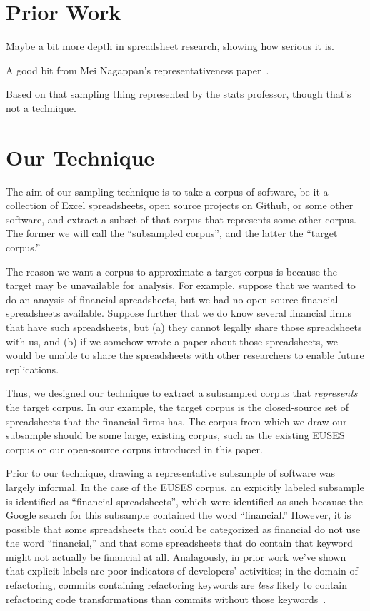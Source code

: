 \documentclass[conference]{IEEEtran}
\begin{document}
\section{Prior Work}

Maybe a bit more depth in spreadsheet research, showing how serious it is.

A good bit from Mei Nagappan's representativeness paper~\cite{nagappan2013diversity}.

Based on that sampling thing represented by the stats professor,
though that's not a technique.

\section{Our Technique}

The aim of our sampling technique is to take a corpus of software, be it 
a collection of Excel spreadsheets, open source projects on Github, 
or some other software, and extract a subset of that corpus that represents
some other corpus.
The former we will call the ``subsampled corpus'', and the latter the
``target corpus.''

The reason we want a corpus to approximate a target corpus is because the 
target may be unavailable for analysis.
For example, suppose that we wanted to do an anaysis of financial spreadsheets,
but we had no open-source financial spreadsheets available.
Suppose further that we do know several financial firms that have such spreadsheets,
but (a) they cannot legally share those spreadsheets with us, and (b) if we somehow wrote a paper
about those spreadsheets, we would be unable to share the spreadsheets with other researchers
to enable future replications.

Thus, we designed our technique to extract a subsampled corpus that \emph{represents}
the target corpus.
In our example, the target corpus is the closed-source set of spreadsheets that the 
financial firms has.
The corpus from which we draw our subsample should be some large, existing corpus, such
as the existing EUSES corpus or our open-source corpus introduced in this paper.


Prior to our technique, drawing a representative subsample of software was largely
informal.
In the case of the EUSES corpus, an expicitly labeled subsample is identified as ``financial spreadsheets'',
which were identified as such because the Google search for this subsample
contained the word ``financial.''
However, it is possible that some spreadsheets that could be categorized as financial do not
use the word ``financial,'' and that some spreadsheets that do contain that keyword might not
actually be financial at all.
Analagously, in prior work we've shown that explicit labels are poor indicators of developers'
activities; in the domain of refactoring, commits containing refactoring keywords are \emph{less}
likely to contain refactoring code transformations than commits without those keywords~\cite{HowWeRefactor}.
\end{document}
